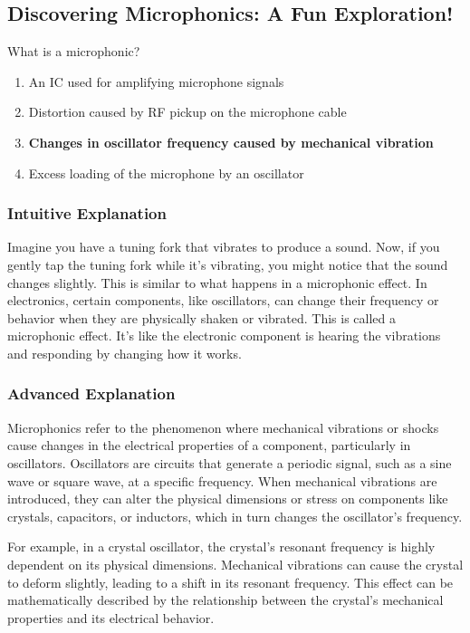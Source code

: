 \subsection{Discovering Microphonics: A Fun Exploration!}

\begin{tcolorbox}[colback=gray!10!white,colframe=black!75!black,title=E7H02] What is a microphonic?  
    \begin{enumerate}[label=\Alph*),noitemsep]
        \item An IC used for amplifying microphone signals
        \item Distortion caused by RF pickup on the microphone cable
        \item \textbf{Changes in oscillator frequency caused by mechanical vibration}
        \item Excess loading of the microphone by an oscillator
    \end{enumerate}
\end{tcolorbox}

\subsubsection{Intuitive Explanation}
Imagine you have a tuning fork that vibrates to produce a sound. Now, if you gently tap the tuning fork while it's vibrating, you might notice that the sound changes slightly. This is similar to what happens in a microphonic effect. In electronics, certain components, like oscillators, can change their frequency or behavior when they are physically shaken or vibrated. This is called a microphonic effect. It’s like the electronic component is hearing the vibrations and responding by changing how it works.

\subsubsection{Advanced Explanation}
Microphonics refer to the phenomenon where mechanical vibrations or shocks cause changes in the electrical properties of a component, particularly in oscillators. Oscillators are circuits that generate a periodic signal, such as a sine wave or square wave, at a specific frequency. When mechanical vibrations are introduced, they can alter the physical dimensions or stress on components like crystals, capacitors, or inductors, which in turn changes the oscillator's frequency.

For example, in a crystal oscillator, the crystal's resonant frequency is highly dependent on its physical dimensions. Mechanical vibrations can cause the crystal to deform slightly, leading to a shift in its resonant frequency. This effect can be mathematically described by the relationship between the crystal's mechanical properties and its electrical behavior.

